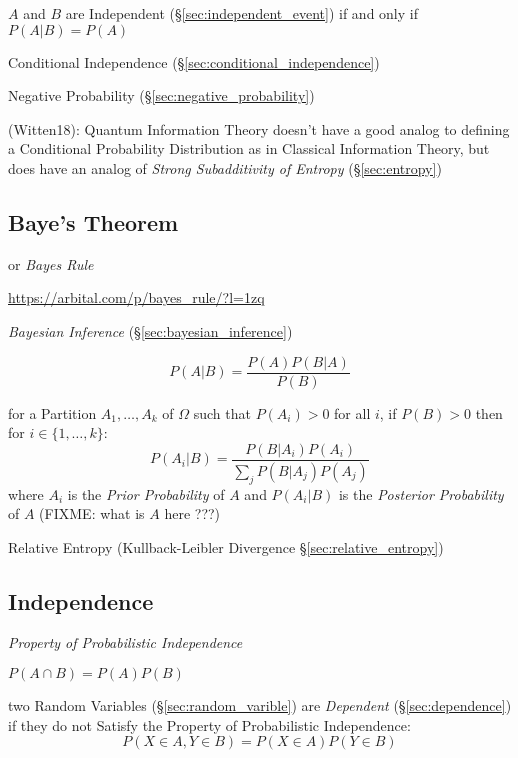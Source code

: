 $A$ and $B$ are Independent (\S\ref{sec:independent_event}) if and only if
$P(A|B) = P(A)$

\fist Conditional Independence (\S\ref{sec:conditional_independence})

\fist Negative Probability (\S\ref{sec:negative_probability})

(Witten18): Quantum Information Theory doesn't have a good analog to defining a
Conditional Probability Distribution as in Classical Information Theory, but
does have an analog of \emph{Strong Subadditivity of Entropy}
(\S\ref{sec:entropy})



\subsection{Baye's Theorem}\label{sec:bayes_theorem}

or \emph{Bayes Rule}

\url{https://arbital.com/p/bayes_rule/?l=1zq}

\emph{Bayesian Inference} (\S\ref{sec:bayesian_inference})

\[
  P(A|B) = \frac{P(A)P(B|A)}{P(B)}
\]

for a Partition $A_1, \ldots, A_k$ of $\Omega$ such that $P(A_i) > 0$ for all
$i$, if $P(B) > 0$ then for $i \in \{1, \ldots, k\}$:
\[
  P(A_i|B) = \frac{
    P(B|A_i)P(A_i)
  }{
    \sum_j P(B|A_j)P(A_j)
  }
\]
where $A_i$ is the \emph{Prior Probability} of $A$ and $P(A_i|B)$ is the
\emph{Posterior Probability} of $A$ (FIXME: what is $A$ here ???)

\fist Relative Entropy (Kullback-Leibler Divergence
\S\ref{sec:relative_entropy})



\subsection{Independence}\label{sec:independence}

\emph{Property of Probabilistic Independence}

$P(A \cap B) = P(A)P(B)$

two Random Variables (\S\ref{sec:random_varible}) are \emph{Dependent}
(\S\ref{sec:dependence}) if they do not Satisfy the Property of
Probabilistic Independence:
\[
  P(X \in A, Y \in B) = P(X \in A) P(Y \in B)
\]

